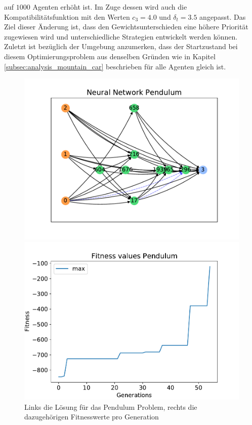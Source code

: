auf $1000$ Agenten erhöht ist. Im Zuge dessen wird auch die Kompatibilitätsfunktion mit den Werten $c_3=4.0$ und $\delta_t=3.5$ angepasst. Das Ziel dieser Änderung ist, dass den Gewichtsunterschieden eine höhere Priorität zugewiesen wird und unterschiedliche Strategien entwickelt werden können. Zuletzt ist bezüglich der Umgebung anzumerken, dass der Startzustand bei diesem Optimierungsproblem aus denselben Gründen wie in Kapitel \ref{subsec:analysis_mountain_car} beschrieben für alle Agenten gleich ist.  
\begin{figure}[!h]
	\centering
	\begin{minipage}[]{0.49\textwidth}
		\includegraphics[width=1.0\textwidth]{./img/pendulum_single_core/pendulum_1_neural_network.pdf} 
	\end{minipage}
	\hfill
	\begin{minipage}[]{0.49\textwidth}
		\includegraphics[width=1.0\textwidth]{./img/pendulum_single_core/pendulum_1_fitness_values.pdf} 
	\end{minipage}
	\caption{Links die Lösung für das Pendulum Problem, rechts die dazugehörigen Fitnesswerte pro Generation}
	\label{fig:pendulum_car_1core_neural_network_and_fitness}
\end{figure}

